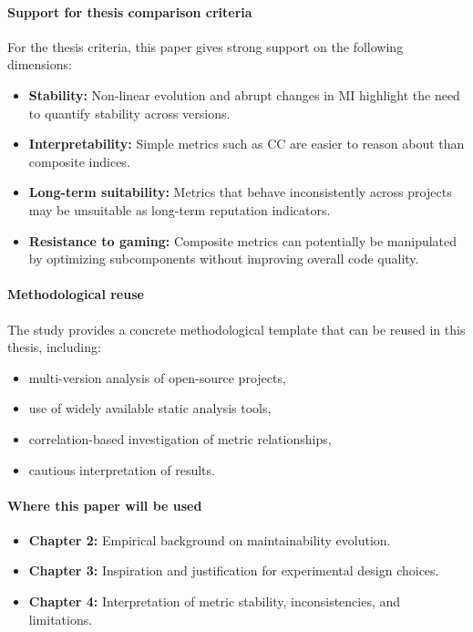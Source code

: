 \documentclass[11pt,a4paper]{article}
\begin{document}
\paragraph{Support for thesis comparison criteria}
For the thesis criteria, this paper gives strong support on the following dimensions:
\begin{itemize}[leftmargin=*]
  \item \textbf{Stability:} Non-linear evolution and abrupt changes in MI highlight the need to quantify stability across versions.
  \item \textbf{Interpretability:} Simple metrics such as CC are easier to reason about than composite indices.
  \item \textbf{Long-term suitability:} Metrics that behave inconsistently across projects may be unsuitable as long-term reputation indicators.
  \item \textbf{Resistance to gaming:} Composite metrics can potentially be manipulated by optimizing subcomponents without improving overall code quality.
\end{itemize}

\paragraph{Methodological reuse}
The study provides a concrete methodological template that can be reused in this thesis, including:
\begin{itemize}[leftmargin=*]
  \item multi-version analysis of open-source projects,
  \item use of widely available static analysis tools,
  \item correlation-based investigation of metric relationships,
  \item cautious interpretation of results.
\end{itemize}

\paragraph{Where this paper will be used}
\begin{itemize}[leftmargin=*]
  \item \textbf{Chapter 2:} Empirical background on maintainability evolution.
  \item \textbf{Chapter 3:} Inspiration and justification for experimental design choices.
  \item \textbf{Chapter 4:} Interpretation of metric stability, inconsistencies, and limitations.
\end{itemize}
\end{document}
